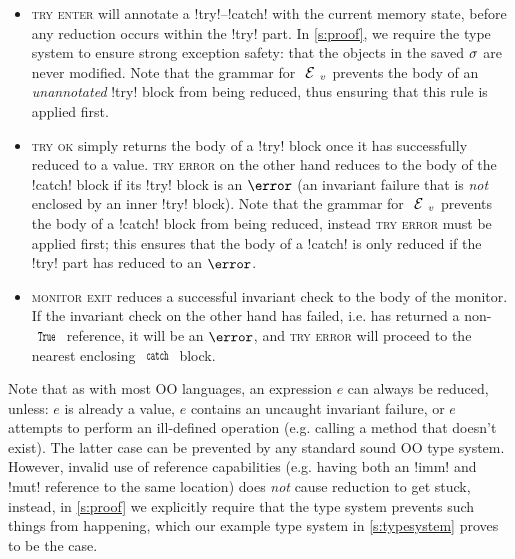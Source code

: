 \begin{itemize}
\item \textsc{try enter} will annotate a \Q!try!--\Q!catch! with the current memory state, before any reduction occurs within the \Q!try! part. In \autoref{s:proof}, we require the type system to ensure strong exception safety: that the objects in the saved $\sigma$ are never modified. Note that the grammar for $\EV$ prevents the body of an \emph{unannotated} \Q!try! block from being reduced, thus ensuring that this rule is applied first.

\item \textsc{try ok} simply returns the body of a \Q!try! block once it has successfully reduced to a value. \textsc{try error} on the other hand reduces to the body of the \Q!catch! block if its \Q!try! block is an $\error$ (an invariant failure that is \emph{not} enclosed by an inner \Q!try! block). Note that the grammar for $\EV$ prevents the body of a \Q!catch! block from being reduced, instead \textsc{try error} must be applied first; this ensures that the body of a \Q!catch! is only reduced if the \Q!try! part has reduced to an $\error$.

\item \textsc{monitor exit} reduces a successful invariant check to the body of the monitor. If the invariant check on the other hand has failed, i.e. has returned a non-$\Kw{True}$ reference, it will be an $\error$, and \textsc{try error} will proceed to the nearest enclosing $\Kw{catch}$ block.
\end{itemize}

Note that as with most OO languages, an expression $e$ can always be reduced, unless: $e$ is already a value, $e$ contains an uncaught invariant failure, or $e$ attempts to perform an ill-defined operation (e.g. calling a method that doesn't exist). The latter case can be prevented by any standard sound OO type system.
However, invalid use of reference capabilities (e.g. having both an \Q!imm! and \Q!mut! reference to the same location) does \emph{not} cause reduction to get stuck, instead, in \autoref{s:proof} we explicitly require that the type system prevents such things from happening, which our example type system in \autoref{s:typesystem} proves to be the case.

